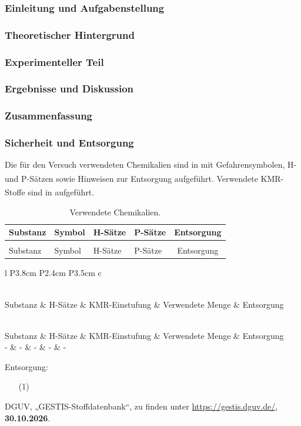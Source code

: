 \documentclass[
	a4paper,										%
	12pt,											%
	twoside,										%
	headsepline,								%
	footsepline,									%
	captions=tableheading,					%
]{scrartcl}
\newcommand{\zitat}[1]{\textsuperscript{\cite{#1}}}
\newcommand{\langetabelle}[6]{  %
	\begin{centering}           %
		{\begin{longtable}[#3]{#4}
				\caption{#2\label{tab: #1}}\\				
				\hline
				#5
				\hline
				\endfirsthead
                \caption{#2\label{tab: #1}}\\
				\hline
				#5
				\hline
				\endhead
				#6												
				\hline 
		\end{longtable}}
\end{centering}}
\begin{document}
\subsubsection{Einleitung und Aufgabenstellung}


\subsubsection{Theoretischer Hintergrund}


\subsubsection{Experimenteller Teil}


\subsubsection{Ergebnisse und Diskussion}

\subsubsection{Zusammenfassung}

\subsubsection{Sicherheit und Entsorgung}
		
Die für den Versuch verwendeten Chemikalien sind in  mit Gefahrensymbolen, H- und P-Sätzen sowie Hinweisen zur Entsorgung aufgeführt.\zitat{hauke3} Verwendete KMR-Stoffe sind in  aufgeführt.\zitat{hauke3}
	
\langetabelle
	{Chemikalien3}
	{Verwendete Chemikalien.}
	{H}  %
	{l p{1.9cm} p{2.2cm} p{4.5cm} c}
	{Substanz & Symbol & H-Sätze & P-Sätze & Entsorgung \\}
	{ %

    }

\langetabelle
	{KMR_leer3}
	{Verwendete kanzerogene, mutagene oder reproduktionstoxische Gefahrstoffe (KMR).}
	{H}
	{l P{3.8cm} P{2.4cm} P{3.5cm} c}
	{Substanz & H-Sätze & KMR-Einstufung & Verwendete Menge & Entsorgung \\}
	{ - & - & - & - & - \\}
	
Entsorgung: \\
\begin{itemize}
    \item[(1)]
\end{itemize}	


\begin{thebibliography}{4}		%

						{DGUV}, 
						„{GESTIS-Stoffdatenbank}“, zu finden unter 
			\url		{https://gestis.dguv.de/}, 
			\textbf	{30.10.2026}.


\end{thebibliography}
\end{document}
